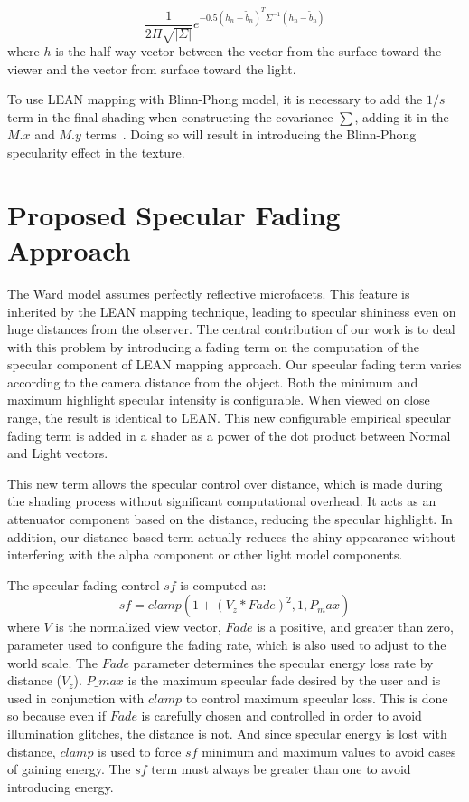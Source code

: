 \documentclass[10pt, conference]{IEEEtran}
\begin{document}
\begin{equation}
	\label{eq:lean_spec}
	\dfrac{1}{2\Pi\sqrt{|\Sigma|}}e^{-0.5(h_{n} - \tilde{b}_{n})^{T} \Sigma^{-1}(h_{n} - \tilde{b}_{n})}
\end{equation}
where $h$ is the half way vector between the vector from the surface toward the viewer and the vector from surface toward the light.

To use LEAN mapping with Blinn-Phong model, it is necessary to add the $1 / s$ term in the final shading when constructing the covariance $∑$, adding it in the $M.x$ and $M.y$ terms~\cite{Olano:2010:LM:1730804.1730834}. Doing so will result in introducing the Blinn-Phong specularity effect in the texture.


\section{Proposed Specular Fading Approach}
\label{sec:specular_fading}
%
The Ward model assumes perfectly reflective microfacets. This feature is inherited by the LEAN mapping technique, leading to specular shininess even on huge distances from the observer. The central contribution of our work is to deal with this problem by introducing a fading term on the computation of the specular component of LEAN mapping approach. Our specular fading term varies according to the camera distance from the object. Both the minimum and maximum highlight specular intensity is configurable. When viewed on close range, the result is identical to LEAN. This new configurable empirical specular fading term is added in a shader as a power of the dot product between Normal and Light vectors.

This new term allows the specular control over distance, which is made during the shading process without significant computational overhead. It acts as an attenuator component based on the distance, reducing the specular highlight. In addition, our distance-based term actually reduces the shiny appearance without interfering with the alpha component or other light model components.

The specular fading control $sf$ is computed as:
\begin{equation}
	\label{eq:sf}
	sf = clamp(1 + (V_{z} * Fade)^{2}, 1, P_max)
\end{equation}
where $V$ is the normalized view vector, $Fade$ is a positive, and greater than zero, parameter used to configure the fading rate, which is also used to adjust to the world scale. The $Fade$ parameter determines the specular energy loss rate by distance ($V_{z}$). $P\_{max}$ is the maximum specular fade desired by the user and is used in conjunction with $clamp$ to control maximum specular loss. This is done so because even if $Fade$ is carefully chosen and controlled in order to avoid illumination glitches, the distance is not. And since specular energy is lost with distance, $clamp$ is used to force $sf$ minimum and maximum values to avoid cases of gaining energy. The $sf$ term must always be greater than one to avoid introducing energy.
\end{document}

